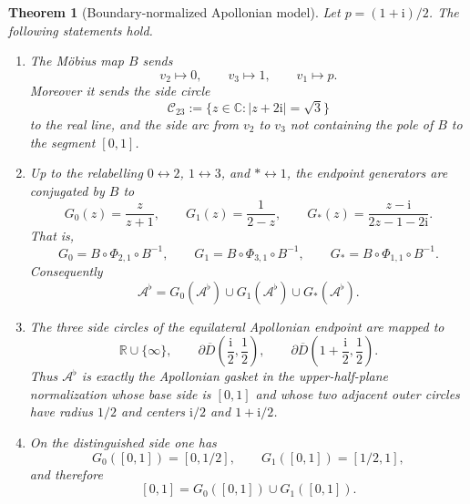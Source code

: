 \documentclass[11pt]{amsart}
\newtheorem{theorem}{Theorem}[section]
\theoremstyle{definition}
\newcommand{\R}{\mathbb{R}}
\newcommand{\C}{\mathbb{C}}
\newcommand{\ii}{\mathrm{i}}
\begin{document}
\begin{theorem}[Boundary-normalized Apollonian model]\label{ap:thm:boundary-model}
Let $p=(1+\ii)/2$. The following statements hold.
\begin{enumerate}[label=(\roman*)]
\item The M\"obius map $B$ sends
\[
  v_2\longmapsto 0,
  \qquad
  v_3\longmapsto 1,
  \qquad
  v_1\longmapsto p.
\]
Moreover it sends the side circle
\[
  \mathcal C_{23}:=\{z\in\C: |z+2\ii|=\sqrt3\}
\]
to the real line, and the side arc from $v_2$ to $v_3$ not containing the pole of $B$ to the segment $[0,1]$.
\item Up to the relabelling $0\leftrightarrow 2$, $1\leftrightarrow 3$, and $\ast\leftrightarrow 1$, the endpoint generators are conjugated by $B$ to
\begin{equation}\label{ap:eq:boundary-generators}
  G_0(z)=\frac{z}{z+1},
  \qquad
  G_1(z)=\frac{1}{2-z},
  \qquad
  G_\ast(z)=\frac{z-\ii}{2z-1-2\ii}.
\end{equation}
That is,
\[
  G_0=B\circ\Phi_{2,1}\circ B^{-1},
  \qquad
  G_1=B\circ\Phi_{3,1}\circ B^{-1},
  \qquad
  G_\ast=B\circ\Phi_{1,1}\circ B^{-1}.
\]
Consequently
\[
  \mathcal A^{\flat}=G_0(\mathcal A^{\flat})\cup G_1(\mathcal A^{\flat})\cup G_\ast(\mathcal A^{\flat}).
\]
\item The three side circles of the equilateral Apollonian endpoint are mapped to
\[
  \R\cup\{\infty\},
  \qquad
  \partial\overline{D}\!\left(\frac{\ii}{2},\frac12\right),
  \qquad
  \partial\overline{D}\!\left(1+\frac{\ii}{2},\frac12\right).
\]
Thus $\mathcal A^{\flat}$ is exactly the Apollonian gasket in the upper-half-plane normalization whose base side is $[0,1]$ and whose two adjacent outer circles have radius $1/2$ and centers $\ii/2$ and $1+\ii/2$.
\item On the distinguished side one has
\[
  G_0([0,1])=[0,1/2],
  \qquad
  G_1([0,1])=[1/2,1],
\]
and therefore
\[
  [0,1]=G_0([0,1])\cup G_1([0,1]).
\]
\end{enumerate}
\end{theorem}
\end{document}
